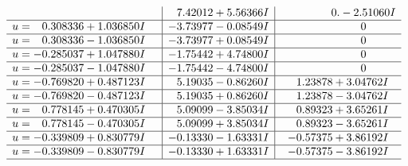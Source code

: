 \documentclass[1p]{elsarticle_modified}
\theoremstyle{definition}
\begin{document}
$$\begin{array}{c|c|c}
 & \phantom{-}7.42012 + 5.56366 I & \phantom{-0.000000 } 0. - 2.51060 I \\ \hline\begin{aligned}
u &= \phantom{-}0.308336 + 1.036850 I\end{aligned}
 & -3.73977 - 0.08549 I & \phantom{-0.000000 } 0 \\ \hline\begin{aligned}
u &= \phantom{-}0.308336 - 1.036850 I\end{aligned}
 & -3.73977 + 0.08549 I & \phantom{-0.000000 } 0 \\ \hline\begin{aligned}
u &= -0.285037 + 1.047880 I\end{aligned}
 & -1.75442 + 4.74800 I & \phantom{-0.000000 } 0 \\ \hline\begin{aligned}
u &= -0.285037 - 1.047880 I\end{aligned}
 & -1.75442 - 4.74800 I & \phantom{-0.000000 } 0 \\ \hline\begin{aligned}
u &= -0.769820 + 0.487123 I\end{aligned}
 & \phantom{-}5.19035 - 0.86260 I & \phantom{-}1.23878 + 3.04762 I \\ \hline\begin{aligned}
u &= -0.769820 - 0.487123 I\end{aligned}
 & \phantom{-}5.19035 + 0.86260 I & \phantom{-}1.23878 - 3.04762 I \\ \hline\begin{aligned}
u &= \phantom{-}0.778145 + 0.470305 I\end{aligned}
 & \phantom{-}5.09099 - 3.85034 I & \phantom{-}0.89323 + 3.65261 I \\ \hline\begin{aligned}
u &= \phantom{-}0.778145 - 0.470305 I\end{aligned}
 & \phantom{-}5.09099 + 3.85034 I & \phantom{-}0.89323 - 3.65261 I \\ \hline\begin{aligned}
u &= -0.339809 + 0.830779 I\end{aligned}
 & -0.13330 - 1.63331 I & -0.57375 + 3.86192 I \\ \hline\begin{aligned}
u &= -0.339809 - 0.830779 I\end{aligned}
 & -0.13330 + 1.63331 I & -0.57375 - 3.86192 I\\
 \hline 
 \end{array}$$\newpage$$\begin{array}{c|c|c}  

\end{array}$$
\end{document}

